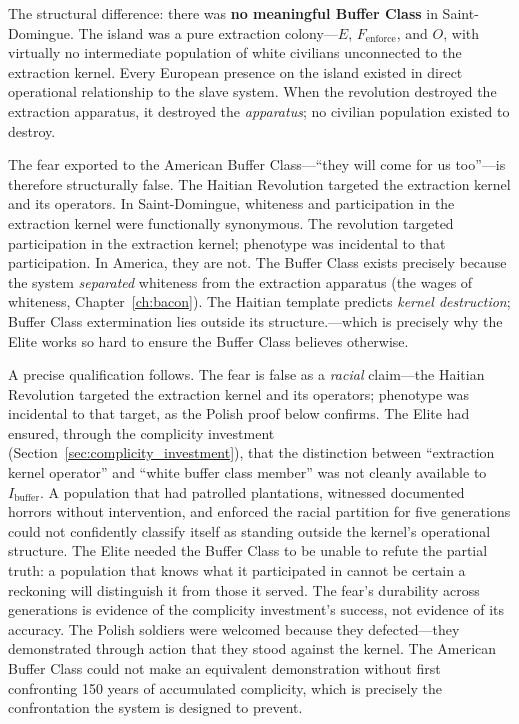 The structural difference: there was \textbf{no meaningful Buffer Class} in Saint-Domingue. The island was a pure extraction colony---$E$, $F_{\text{enforce}}$, and $O$, with virtually no intermediate population of white civilians unconnected to the extraction kernel. Every European presence on the island existed in direct operational relationship to the slave system. When the revolution destroyed the extraction apparatus, it destroyed the \textit{apparatus}; no civilian population existed to destroy.

The fear exported to the American Buffer Class---``they will come for us too''---is therefore structurally false. The Haitian Revolution targeted the extraction kernel and its operators. In Saint-Domingue, whiteness and participation in the extraction kernel were functionally synonymous. The revolution targeted participation in the extraction kernel; phenotype was incidental to that participation. In America, they are not. The Buffer Class exists precisely because the system \textit{separated} whiteness from the extraction apparatus (the wages of whiteness, Chapter~\ref{ch:bacon}). The Haitian template predicts \textit{kernel destruction}; Buffer Class extermination lies outside its structure.---which is precisely why the Elite works so hard to ensure the Buffer Class believes otherwise.

A precise qualification follows. The fear is false as a \textit{racial} claim---the Haitian Revolution targeted the extraction kernel and its operators; phenotype was incidental to that target, as the Polish proof below confirms. The Elite had ensured, through the complicity investment (Section~\ref{sec:complicity_investment}), that the distinction between ``extraction kernel operator'' and ``white buffer class member'' was not cleanly available to $I_{\text{buffer}}$. A population that had patrolled plantations, witnessed documented horrors without intervention, and enforced the racial partition for five generations could not confidently classify itself as standing outside the kernel's operational structure. The Elite needed the Buffer Class to be unable to refute the partial truth: a population that knows what it participated in cannot be certain a reckoning will distinguish it from those it served. The fear's durability across generations is evidence of the complicity investment's success, not evidence of its accuracy. The Polish soldiers were welcomed because they defected---they demonstrated through action that they stood against the kernel. The American Buffer Class could not make an equivalent demonstration without first confronting 150 years of accumulated complicity, which is precisely the confrontation the system is designed to prevent.

